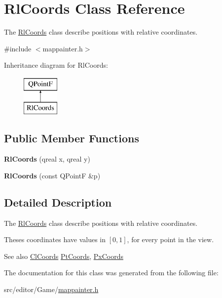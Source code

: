 \hypertarget{class_rl_coords}{}\section{Rl\+Coords Class Reference}
\label{class_rl_coords}


The \hyperlink{class_rl_coords}{Rl\+Coords} class describe positions with relative coordinates.  




{\ttfamily \#include $<$mappainter.\+h$>$}

Inheritance diagram for Rl\+Coords\+:\begin{figure}[H]
\begin{center}
\leavevmode
\includegraphics[height=2.000000cm]{class_rl_coords}
\end{center}
\end{figure}
\subsection*{Public Member Functions}
\begin{DoxyCompactItemize}
\item 
\hypertarget{class_rl_coords_ada69216f57050aa6a7b88aa4cb051335}{}\label{class_rl_coords_ada69216f57050aa6a7b88aa4cb051335} 
{\bfseries Rl\+Coords} (qreal x, qreal y)
\item 
\hypertarget{class_rl_coords_a71620c03bf57e61ec3b35af29dab3382}{}\label{class_rl_coords_a71620c03bf57e61ec3b35af29dab3382} 
{\bfseries Rl\+Coords} (const Q\+PointF \&p)
\end{DoxyCompactItemize}


\subsection{Detailed Description}
The \hyperlink{class_rl_coords}{Rl\+Coords} class describe positions with relative coordinates. 

Theses coordinates have values in $[0,1]$, for every point in the view.

\begin{DoxySeeAlso}{See also}
\hyperlink{class_cl_coords}{Cl\+Coords} \hyperlink{class_pt_coords}{Pt\+Coords}, \hyperlink{class_px_coords}{Px\+Coords} 
\end{DoxySeeAlso}


The documentation for this class was generated from the following file\+:\begin{DoxyCompactItemize}
\item 
src/editor/\+Game/\hyperlink{mappainter_8h}{mappainter.\+h}\end{DoxyCompactItemize}
